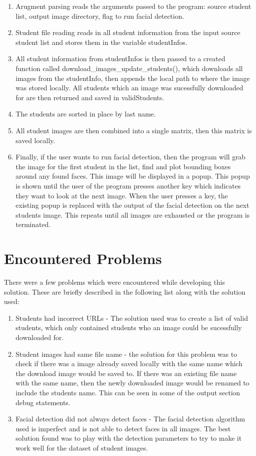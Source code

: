 \documentclass[12pt, letterpaper, final, onecolumn, titlepage] {article}
\begin{document}
\begin{enumerate}
	\item Arugment parsing reads the arguments passed to the program: source student list, output image directory, flag to run facial detection.
	\item Student file reading reads in all student information from the input source student list and stores them in the variable studentInfos.
	\item All student information from studentInfos is then passed to a created function called download\_images\_update\_students(), which downloads all images from the studentInfo, then appends the local path to where the image was stored locally. All students which an image was sucessfully downloaded for are then returned and saved in validStudents.
	\item The students are sorted in place by last name.
	\item All student images are then combined into a single matrix, then this matrix is saved locally.
	\item Finally, if the user wants to run facial detection, then the program will grab the image for the first student in the list, find and plot bounding boxes around any found faces. This image will be displayed in a popup. This popup is shown until the user of the program presses another key which indicates they want to look at the next image. When the user presses a key, the existing popup is replaced with the output of the facial detection on the next students image. This repeats until all images are exhausted or the program is terminated.
\end{enumerate}

\pagebreak
\section{Encountered Problems}
There were a few problems which were encountered while developing this solution. These are briefly described in the following list along with the solution used:
\begin{enumerate}
	\item Students had incorrect URLs - The solution used was to create a list of valid students, which only contained students who an image could be sucessfully downloaded for.
	\item Student images had same file name - the solution for this problem was to check if there was a image already saved locally with the same name which the download image would be saved to. If there was an existing file name with the same name, then the newly downloaded image would be renamed to include the students name. This can be seen in some of the output section debug statements.
	\item Facial detection did not always detect faces - The facial detection algorithm used is imperfect and is not able to detect faces in all images. The best solution found was to play with the detection parameters to try to make it work well for the dataset of student images.
\end{enumerate}
\end{document}
